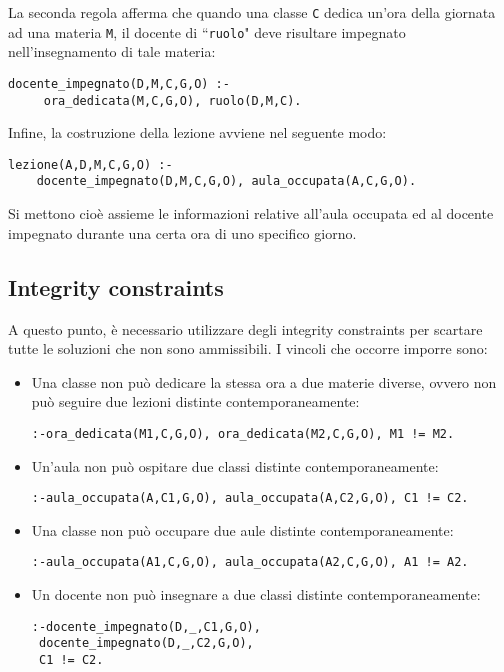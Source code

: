 La seconda regola afferma che quando una classe  \texttt{C} dedica un'ora della giornata ad una materia \texttt{M}, il docente  di ``\texttt{ruolo}" deve risultare impegnato nell'insegnamento di tale materia:
\begin{lstlisting}[frame=single]
docente_impegnato(D,M,C,G,O) :-
	 ora_dedicata(M,C,G,O), ruolo(D,M,C).
\end{lstlisting}

Infine, la costruzione della lezione avviene nel seguente modo: 

\begin{lstlisting}[frame=single]
lezione(A,D,M,C,G,O) :-
	docente_impegnato(D,M,C,G,O), aula_occupata(A,C,G,O). 	
\end{lstlisting}
Si mettono cioè assieme le informazioni relative all'aula occupata ed al docente impegnato durante una certa ora di uno specifico giorno.

\subsection{Integrity constraints}
A questo punto, è necessario utilizzare degli integrity constraints per scartare tutte le soluzioni che non sono ammissibili. I vincoli che occorre imporre sono:

\begin{itemize}[leftmargin=0pt]
\item Una classe non può dedicare la stessa ora a due materie diverse, ovvero non può seguire due lezioni distinte contemporaneamente:
\begin{lstlisting}[frame=single]
:-ora_dedicata(M1,C,G,O), ora_dedicata(M2,C,G,O), M1 != M2.
\end{lstlisting}
\item Un'aula non può ospitare due classi distinte contemporaneamente:
\begin{lstlisting}[frame=single]
:-aula_occupata(A,C1,G,O), aula_occupata(A,C2,G,O), C1 != C2.
\end{lstlisting}
\item Una classe non può occupare due aule distinte contemporaneamente:
\begin{lstlisting}[frame=single]
:-aula_occupata(A1,C,G,O), aula_occupata(A2,C,G,O), A1 != A2.
\end{lstlisting}
\item Un docente non può insegnare a due classi distinte contemporaneamente:
\begin{lstlisting}[frame=single]
:-docente_impegnato(D,_,C1,G,O),
 docente_impegnato(D,_,C2,G,O),
 C1 != C2. 
\end{lstlisting}
\end{itemize}



